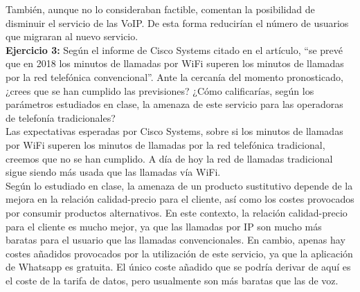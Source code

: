 \documentclass[11pt]{article}
\theoremstyle{plain}
\theoremstyle{definition}
\begin{document}
También, aunque no lo consideraban factible, comentan la posibilidad
de disminuir el servicio de las VoIP. De esta forma reducirían el
número de usuarios que migraran al nuevo servicio.\\

\textbf{Ejercicio 3:} Según el informe de Cisco Systems citado en el
artículo, ``se prevé que en 2018 los minutos de llamadas por WiFi
superen los minutos de llamadas por la red telefónica
convencional''. Ante la cercanía del momento pronosticado, ¿crees que
se han cumplido las previsiones? ¿Cómo calificarías, según los
parámetros estudiados en clase, la amenaza de este servicio para las
operadoras de telefonía tradicionales?\\

Las expectativas esperadas por Cisco Systems, sobre si los minutos de
llamadas por WiFi superen los minutos de llamadas por la red
telefónica tradicional, creemos que no se han cumplido. A día de hoy
la red de llamadas tradicional sigue siendo más usada que las llamadas
vía WiFi.\\

Según lo estudiado en clase, la amenaza de un producto sustitutivo
depende de la mejora en la relación calidad-precio para el cliente,
así como los costes provocados por consumir productos alternativos.
En este contexto, la relación calidad-precio para el cliente es mucho
mejor, ya que las llamadas por IP son mucho más baratas para el
usuario que las llamadas convencionales. En cambio, apenas hay costes
añadidos provocados por la utilización de este servicio, ya que la
aplicación de Whatsapp es gratuita. El único coste añadido que se
podría derivar de aquí es el coste de la tarifa de datos, pero
usualmente son más baratas que las de voz.
\end{document}
